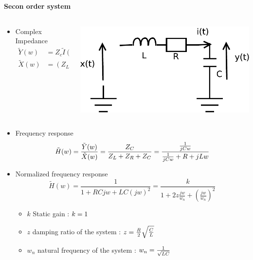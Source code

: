 \paragraph{Secon order system}

\begin{columns}
    \begin{column}{6cm}
   \begin{itemize}
  \item Complex Impedance
\begin{align*}
\tilde Y(w)&=Z_c\tilde  I(w)\\
\tilde X(w)&= (Z_L+Z_R+Z_C) \tilde I(w)\\
\end{align*}
  \end{itemize}       
    \end{column}
    \begin{column}{5cm}
      \begin{center}
\includegraphics[width=.3\columnwidth]{imgs/fourier/RLC}
\end{center}
    \end{column}
  \end{columns}
  \begin{itemize}
  \item Frequency response
$$ \tilde H(w)=\frac{\tilde Y(w)}{\tilde X(w)}=\frac{Z_C}{Z_L+Z_R+Z_C}=\frac{\frac{1}{jCw}}{\frac{1}{jCw}+R+jLw}$$
\item Normalized frequency response
\begin{equation*}
  \tilde H(w)=\frac{1}{1+RCjw+LC(jw)^2}=\frac{k}{1+2z\frac{jw}{w_n}+(\frac{jw}{w_n})^2}
\end{equation*}%
\begin{itemize}
\item $k$ Static gain : $k={1}$
\item $z$ damping ratio of the system : $z= {\frac{R}{2}\sqrt{\frac{C}{L}}}$
\item $w_n$ natural frequency of the system : $w_n= {\frac{1}{\sqrt{LC}}}$
\end{itemize}
  \end{itemize}


